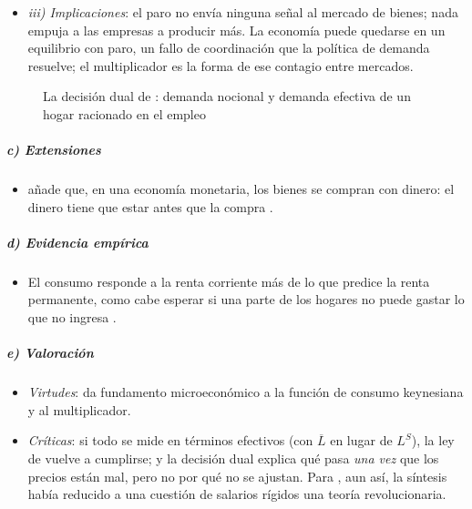 \documentclass[11pt]{article}
\begin{document}
\begin{itemize}
\begin{itemize}
  \item \emph{Un ejemplo}: un consultor sin clientes querría beber champán, y el bodeguero querría vender más champán y contratar consultores para crecer. Los 2~saldrían ganando con el intercambio, pero el deseo del consultor no llega al mercado: sin renta, no es demanda, y el precio no transmite la señal que los coordinaría.
  \end{itemize}
\item \emph{iii) Implicaciones}: el paro no envía ninguna señal al mercado de bienes; nada empuja a las empresas a producir más. La economía puede quedarse en un equilibrio con paro, un fallo de coordinación que la política de demanda resuelve; el multiplicador es la forma de ese contagio entre mercados.
\end{itemize}

\begin{figure}[H]
\centering
\caption{La decisión dual de : demanda nocional y demanda efectiva de un hogar racionado en el empleo}\label{fig:clower}
\end{figure}

\subparagraph{c) Extensiones}

\begin{itemize}
\item \textcite{Clower1967Reconsideration} añade que, en una economía monetaria, los bienes se compran con dinero: el dinero tiene que estar antes que la compra .
\end{itemize}

\subparagraph{d) Evidencia empírica}

\begin{itemize}
\item El consumo responde a la renta corriente más de lo que predice la renta permanente, como cabe esperar si una parte de los hogares no puede gastar lo que no ingresa .
\end{itemize}

\subparagraph{e) Valoración}

\begin{itemize}
\item \emph{Virtudes}: da fundamento microeconómico a la función de consumo keynesiana y al multiplicador.
\item \emph{Críticas}: si todo se mide en términos efectivos (con $\overline{L}$ en lugar de $L^S$), la ley de  vuelve a cumplirse; y la decisión dual explica qué pasa \emph{una vez} que los precios están mal, pero no por qué no se ajustan. Para , aun así, la síntesis había reducido a una cuestión de salarios rígidos una teoría revolucionaria.
\end{itemize}
\end{document}
